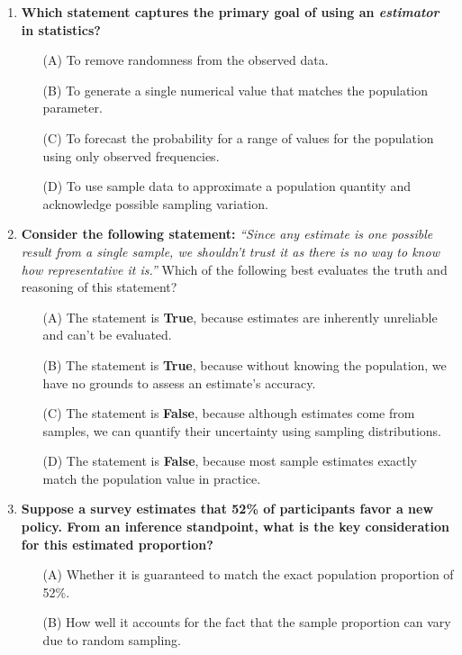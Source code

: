 \documentclass{article}
\begin{document}
\begin{enumerate}
    \item \textbf{Which statement captures the primary goal of using an \emph{estimator} in statistics?}
        \begin{enumerate}
        \item[(A)] To remove randomness from the observed data.
        \item[(B)] To generate a single numerical value that matches the population parameter.
        \item[(C)] To forecast the probability for a range of values for the population using only observed frequencies.
        \item[(D)] To use sample data to approximate a population quantity and acknowledge possible sampling variation.
        \end{enumerate}
    \item \textbf{Consider the following statement:} \newline
        \emph{``Since any estimate is one possible result from a single sample, we shouldn’t trust it as there is no way to know how representative it is.”} \newline
        Which of the following best evaluates the truth and reasoning of this statement?
        \begin{enumerate}
        \item[(A)] The statement is \textbf{True}, because estimates are inherently unreliable and can’t be evaluated.
        \item[(B)] The statement is \textbf{True}, because without knowing the population, we have no grounds to assess an estimate’s accuracy.
        \item[(C)] The statement is \textbf{False}, because although estimates come from samples, we can quantify their uncertainty using sampling distributions.
        \item[(D)] The statement is \textbf{False}, because most sample estimates exactly match the population value in practice.
        \end{enumerate}
    \item \textbf{Suppose a survey estimates that 52\% of participants favor a new policy. From an inference standpoint, what is the key consideration for this estimated proportion?}
        \begin{enumerate}
        \item[(A)] Whether it is guaranteed to match the exact population proportion of 52\%.
        \item[(B)] How well it accounts for the fact that the sample proportion can vary due to random sampling.

\end{enumerate}
\end{enumerate}
\end{document}
